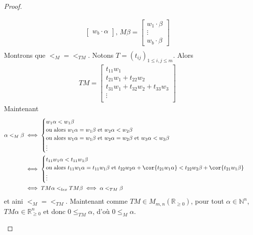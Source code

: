 \begin{proof}
\begin{enumerate}
\begin{align*}
\begin{bmatrix}
                        w_b \cdot \alpha
                    \end{bmatrix}
                    ,\, M \beta =
                    \begin{bmatrix}
                        w_1 \cdot \beta \\
                        \vdots \\
                        w_b \cdot \beta
                    \end{bmatrix} \\
                \end{align*}
                Montrons que $<_M = <_{TM}$. Notons $T = (t_{ij})_{1 \leq i,j \leq m}$. Alors
                \begin{align*}
                    TM =
                    \begin{bmatrix}
                        t_{11} w_1 \\
                        t_{21} w_1 + t_{22} w_2 \\
                        t_{31} w_1 + t_{32} w_2 + t_{33} w_3 \\
                        \vdots \\
                    \end{bmatrix}
                \end{align*}
                Maintenant
                \begin{align*}
                    \alpha <_M \beta &\iff 
                    \begin{cases}
                        w_1 \alpha < w_1 \beta \\
                        \text{ou alors } w_1\alpha = w_1 \beta \text{ et } w_2 \alpha < w_2 \beta \\
                        \text{ou alors } w_1\alpha = w_1 \beta \text{ et } w_2 \alpha = w_2 \beta \text{ et } w_3 \alpha < w_3 \beta \\
                        \vdots
                    \end{cases} \\
                    &\iff 
                    \begin{cases}
                        t_{11} w_1 \alpha < t_{11} w_1 \beta \\
                        \text{ou alors } t_{11} w_1 \alpha = t_{11} w_1 \beta \text{ et } t_{22} w_2 \alpha + \cor{t_{21} w_1 \alpha} < t_{22} w_2 \beta + \cor{t_{21} w_1 \beta} \\
                        \vdots 
                    \end{cases} \\
                    &\iff TM \alpha <_{lex} TM \beta \iff \alpha <_{TM} \beta
                \end{align*}
                et aini $<_M = <_{TM}$. Maintenant comme $TM \in M_{m,n}(\mathbb{R}_{\geq 0})$, pour tout $\alpha \in \mathbb{N}^n$, $TM\alpha \in \mathbb{R}^n_{\geq 0}$ et donc $0 \leq_{TM} \alpha$, d'où $0 \leq_M \alpha$.
            \end{enumerate}
        \end{proof}
